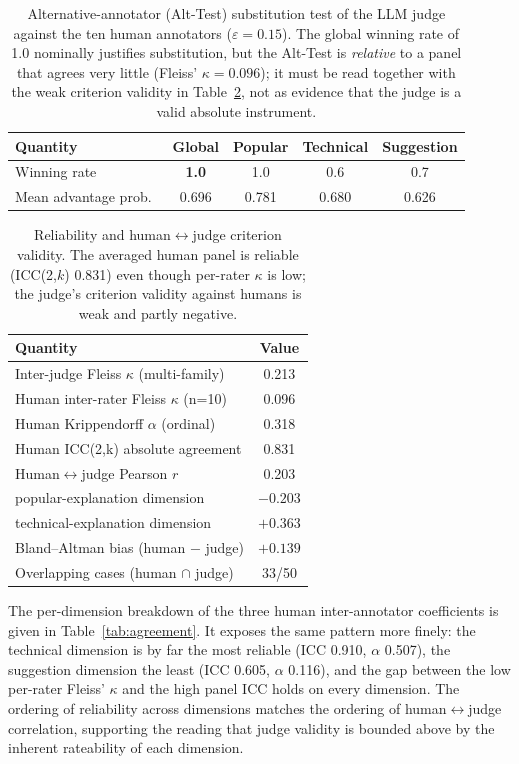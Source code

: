 \documentclass[sageh]{sagej}
\begin{document}
\begin{table}[t]
\centering
\caption{Alternative-annotator (Alt-Test) substitution test of the LLM judge against the ten human annotators\cite{calderon2025alttest} ($\varepsilon=0.15$). The global winning rate of 1.0 nominally justifies substitution, but the Alt-Test is \emph{relative} to a panel that agrees very little (Fleiss' $\kappa=0.096$); it must be read together with the weak criterion validity in Table~\ref{tab:reliability}, not as evidence that the judge is a valid absolute instrument.\label{tab:alttest}}
\begin{tabular}{@{}lcccc@{}}
\toprule
Quantity & Global & Popular & Technical & Suggestion \\
\midrule
Winning rate          & \textbf{1.0} & 1.0 & 0.6 & 0.7 \\
Mean advantage prob.\ & 0.696 & 0.781 & 0.680 & 0.626 \\
\bottomrule
\end{tabular}
\end{table}

\begin{table}[t]
\centering
\caption{Reliability and human$\leftrightarrow$judge criterion validity. The averaged human panel is reliable (ICC(2,$k$) 0.831) even though per-rater $\kappa$ is low; the judge's criterion validity against humans is weak and partly negative.\label{tab:reliability}}
\begin{tabular}{@{}lc@{}}
\toprule
Quantity & Value \\
\midrule
Inter-judge Fleiss $\kappa$ (multi-family) & 0.213 \\
Human inter-rater Fleiss $\kappa$ (n=10)   & 0.096 \\
Human Krippendorff $\alpha$ (ordinal)      & 0.318 \\
Human ICC(2,k) absolute agreement          & 0.831 \\
Human$\leftrightarrow$judge Pearson $r$    & 0.203 \\
\quad popular-explanation dimension        & $-0.203$ \\
\quad technical-explanation dimension      & $+0.363$ \\
Bland--Altman bias (human $-$ judge)       & $+0.139$ \\
Overlapping cases (human $\cap$ judge)     & 33/50 \\
\bottomrule
\end{tabular}
\end{table}

The per-dimension breakdown of the three human inter-annotator coefficients is given in Table~\ref{tab:agreement}. It exposes the same pattern more finely: the technical dimension is by far the most reliable (ICC 0.910, $\alpha$ 0.507), the suggestion dimension the least (ICC 0.605, $\alpha$ 0.116), and the gap between the low per-rater Fleiss' $\kappa$ and the high panel ICC holds on every dimension. The ordering of reliability across dimensions matches the ordering of human$\leftrightarrow$judge correlation, supporting the reading that judge validity is bounded above by the inherent rateability of each dimension.
\end{document}
